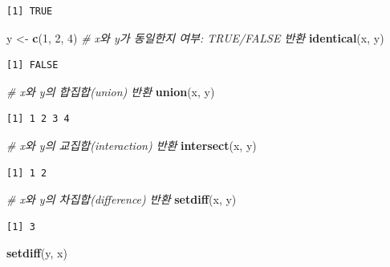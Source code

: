 \documentclass[11pt,a4paper]{book}
\newenvironment{Shaded}{\begin{snugshade}}{\end{snugshade}}
\newcommand{\KeywordTok}[1]{\textcolor[rgb]{0.13,0.29,0.53}{\textbf{#1}}}
\newcommand{\DecValTok}[1]{\textcolor[rgb]{0.00,0.00,0.81}{#1}}
\newcommand{\StringTok}[1]{\textcolor[rgb]{0.31,0.60,0.02}{#1}}
\newcommand{\CommentTok}[1]{\textcolor[rgb]{0.56,0.35,0.01}{\textit{#1}}}
\newcommand{\NormalTok}[1]{#1}
\theoremstyle{definition}
\theoremstyle{definition}
\theoremstyle{definition}
\theoremstyle{remark}
\begin{document}
\begin{verbatim}
[1] TRUE
\end{verbatim}

\begin{Shaded}
\begin{Highlighting}[]
\NormalTok{y <-}\StringTok{ }\KeywordTok{c}\NormalTok{(}\DecValTok{1}\NormalTok{, }\DecValTok{2}\NormalTok{, }\DecValTok{4}\NormalTok{)}
\CommentTok{# x와 y가 동일한지 여부: TRUE/FALSE 반환}
\KeywordTok{identical}\NormalTok{(x, y)}
\end{Highlighting}
\end{Shaded}

\begin{verbatim}
[1] FALSE
\end{verbatim}

\begin{Shaded}
\begin{Highlighting}[]
\CommentTok{# x와 y의 합집합(union) 반환}
\KeywordTok{union}\NormalTok{(x, y)}
\end{Highlighting}
\end{Shaded}

\begin{verbatim}
[1] 1 2 3 4
\end{verbatim}

\begin{Shaded}
\begin{Highlighting}[]
\CommentTok{# x와 y의 교집합(interaction) 반환}
\KeywordTok{intersect}\NormalTok{(x, y)}
\end{Highlighting}
\end{Shaded}

\begin{verbatim}
[1] 1 2
\end{verbatim}

\begin{Shaded}
\begin{Highlighting}[]
\CommentTok{# x와 y의 차집합(difference) 반환}
\KeywordTok{setdiff}\NormalTok{(x, y)}
\end{Highlighting}
\end{Shaded}

\begin{verbatim}
[1] 3
\end{verbatim}

\begin{Shaded}
\begin{Highlighting}[]
\KeywordTok{setdiff}\NormalTok{(y, x)}
\end{Highlighting}
\end{Shaded}
\end{document}
